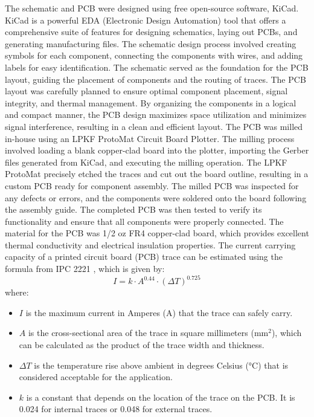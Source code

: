 \documentclass[12pt]{article} %
\begin{document}
\pagebreak
\noindent The schematic and PCB were designed using free open-source software, KiCad. KiCad is a powerful EDA (Electronic Design Automation) tool that offers a comprehensive suite of features for designing schematics, laying out PCBs, and generating manufacturing files. The schematic design process involved creating symbols for each component, connecting the components with wires, and adding labels for easy identification. The schematic served as the foundation for the PCB layout, guiding the placement of components and the routing of traces. The PCB layout was carefully planned to ensure optimal component placement, signal integrity, and thermal management. By organizing the components in a logical and compact manner, the PCB design maximizes space utilization and minimizes signal interference, resulting in a clean and efficient layout.
\newline
\newline
\noindent The PCB was milled in-house using an LPKF ProtoMat Circuit Board Plotter. The milling process involved loading a blank copper-clad board into the plotter, importing the Gerber files generated from KiCad, and executing the milling operation. The LPKF ProtoMat precisely etched the traces and cut out the board outline, resulting in a custom PCB ready for component assembly. The milled PCB was inspected for any defects or errors, and the components were soldered onto the board following the assembly guide. The completed PCB was then tested to verify its functionality and ensure that all components were properly connected. The material for the PCB was 1/2 oz FR4 copper-clad board, which provides excellent thermal conductivity and electrical insulation properties.
\newline
\newline
\noindent The current carrying capacity of a printed circuit board (PCB) trace can be estimated using the formula from IPC 2221 \cite{ref_ipc_2221}, which is given by:
\begin{equation}
    I = k \cdot A^{0.44} \cdot (\Delta T)^{0.725}
\end{equation}
where:
\begin{itemize}
    \item \(I\) is the maximum current in Amperes (A) that the trace can safely carry.
    \item \(A\) is the cross-sectional area of the trace in square millimeters (mm\(^2\)), which can be calculated as the product of the trace width and thickness.
    \item \(\Delta T\) is the temperature rise above ambient in degrees Celsius (°C) that is considered acceptable for the application.
    \item \(k\) is a constant that depends on the location of the trace on the PCB. It is 0.024 for internal traces or 0.048 for external traces.
\end{itemize}
\end{document}
